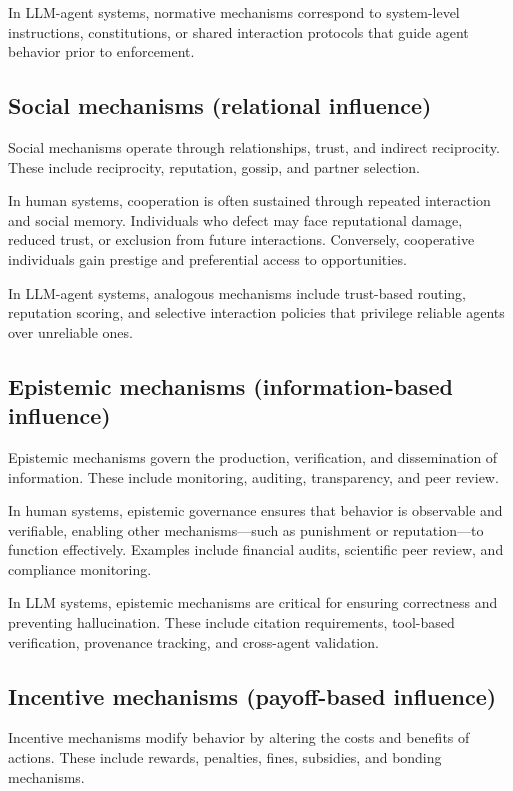 {In LLM-agent systems, normative mechanisms correspond to system-level instructions, constitutions, or shared interaction protocols that guide agent behavior prior to enforcement.

\subsection{Social mechanisms (relational influence)}
Social mechanisms operate through relationships, trust, and indirect reciprocity. These include reciprocity, reputation, gossip, and partner selection.

In human systems, cooperation is often sustained through repeated interaction and social memory. Individuals who defect may face reputational damage, reduced trust, or exclusion from future interactions. Conversely, cooperative individuals gain prestige and preferential access to opportunities.

In LLM-agent systems, analogous mechanisms include trust-based routing, reputation scoring, and selective interaction policies that privilege reliable agents over unreliable ones.



\subsection{Epistemic mechanisms (information-based influence)}
Epistemic mechanisms govern the production, verification, and dissemination of information. These include monitoring, auditing, transparency, and peer review.

In human systems, epistemic governance ensures that behavior is observable and verifiable, enabling other mechanisms—such as punishment or reputation—to function effectively. Examples include financial audits, scientific peer review, and compliance monitoring.

In LLM systems, epistemic mechanisms are critical for ensuring correctness and preventing hallucination. These include citation requirements, tool-based verification, provenance tracking, and cross-agent validation.


\subsection{Incentive mechanisms (payoff-based influence)}
Incentive mechanisms modify behavior by altering the costs and benefits of actions. These include rewards, penalties, fines, subsidies, and bonding mechanisms.

}
